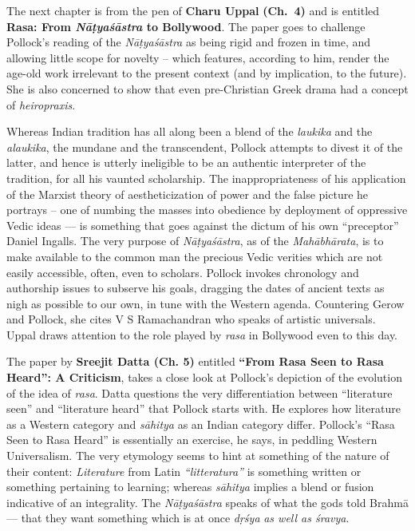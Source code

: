 The next chapter is from the pen of {\bf Charu Uppal} {\bf(Ch.~4)} and is entitled {\bf Rasa: From \textsl{Nāṭyaśāstra} to Bollywood}. The paper goes to challenge Pollock’s reading of the \textsl{Nāṭyaśāstra} as being rigid and frozen in time, and allowing little scope for novelty -- which features, according to him, render the age-old work irrelevant to the present context (and by implication, to the future). She is also concerned to show that even pre-Christian Greek drama had a concept of \textsl{heiropraxis}.

Whereas Indian tradition has all along been a blend of the \textsl{laukika} and the \textsl{alaukika}, the mundane and the transcendent, Pollock attempts to divest it of the latter, and hence is utterly ineligible to be an authentic interpreter of the tradition, for all his vaunted scholarship. The inappropriateness of his application of the Marxist theory of aestheticization of power and the false picture he portrays -- one of numbing the masses into obedience by deployment of oppressive Vedic ideas --- is something that goes against the dictum of his own “preceptor” Daniel Ingalls. The very purpose of \textsl{Nāṭyaśāstra}, as of the \textsl{Mahābhārata}, is to make available to the common man the precious Vedic verities which are not easily accessible, often, even to scholars. Pollock invokes chronology and authorship issues to subserve his goals, dragging the dates of ancient texts as nigh as possible to our own, in tune with the Western agenda. Countering Gerow and Pollock, she cites V S Ramachandran who speaks of artistic universals. Uppal draws attention to the role played by \textsl{rasa} in Bollywood even to this day.

The paper by {\bf Sreejit Datta (Ch. 5)} entitled {\bf “From Rasa Seen to Rasa Heard”: A Criticism}, takes a close look at Pollock’s depiction of the evolution of the idea of \textsl{rasa}. Datta questions the very differentiation between “literature seen” and “literature heard” that Pollock starts with. He explores how literature as a Western category and \textsl{sāhitya} as an Indian category differ. Pollock’s “Rasa Seen to Rasa Heard” is essentially an exercise, he says, in peddling Western Universalism. The very etymology seems to hint at something of the nature of their content: \textsl{Literature} from Latin \textsl{“litteratura”} is something written or something pertaining to learning; whereas \textsl{sāhitya} implies a blend or fusion indicative of an integrality. The \textsl{Nāṭyaśāstra} speaks of what the gods told Brahmā --- that they want something which is at once \textsl{dṛśya} \textsl{as well as śravya}.

